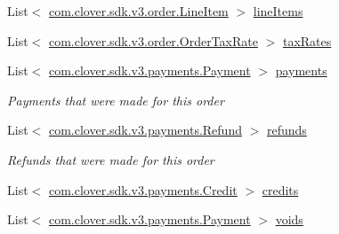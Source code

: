 \begin{DoxyCompactItemize}
\item 
List$<$ \hyperlink{classcom_1_1clover_1_1sdk_1_1v3_1_1order_1_1_line_item}{com.\+clover.\+sdk.\+v3.\+order.\+Line\+Item} $>$ \hyperlink{classcom_1_1clover_1_1sdk_1_1v3_1_1order_1_1_order_a6c287a60b0889932c840125ce1bef7a9}{line\+Items}
\item 
List$<$ \hyperlink{classcom_1_1clover_1_1sdk_1_1v3_1_1order_1_1_order_tax_rate}{com.\+clover.\+sdk.\+v3.\+order.\+Order\+Tax\+Rate} $>$ \hyperlink{classcom_1_1clover_1_1sdk_1_1v3_1_1order_1_1_order_aa2d8f4b170ba93a76d462d943a70d1e0}{tax\+Rates}
\item 
List$<$ \hyperlink{classcom_1_1clover_1_1sdk_1_1v3_1_1payments_1_1_payment}{com.\+clover.\+sdk.\+v3.\+payments.\+Payment} $>$ \hyperlink{classcom_1_1clover_1_1sdk_1_1v3_1_1order_1_1_order_a0ea40bf866682b62f640bfb510c72223}{payments}
\begin{DoxyCompactList}\small\item\em Payments that were made for this order \end{DoxyCompactList}\item 
List$<$ \hyperlink{classcom_1_1clover_1_1sdk_1_1v3_1_1payments_1_1_refund}{com.\+clover.\+sdk.\+v3.\+payments.\+Refund} $>$ \hyperlink{classcom_1_1clover_1_1sdk_1_1v3_1_1order_1_1_order_a6741711b01ec81bc71bbb2e46f943268}{refunds}
\begin{DoxyCompactList}\small\item\em Refunds that were made for this order \end{DoxyCompactList}\item 
List$<$ \hyperlink{classcom_1_1clover_1_1sdk_1_1v3_1_1payments_1_1_credit}{com.\+clover.\+sdk.\+v3.\+payments.\+Credit} $>$ \hyperlink{classcom_1_1clover_1_1sdk_1_1v3_1_1order_1_1_order_a47c888717541aeee0e45bea1ef2b2bb6}{credits}
\item 
List$<$ \hyperlink{classcom_1_1clover_1_1sdk_1_1v3_1_1payments_1_1_payment}{com.\+clover.\+sdk.\+v3.\+payments.\+Payment} $>$ \hyperlink{classcom_1_1clover_1_1sdk_1_1v3_1_1order_1_1_order_afa873072e171007d2a63a9c84be27c25}{voids}

\end{DoxyCompactItemize}
